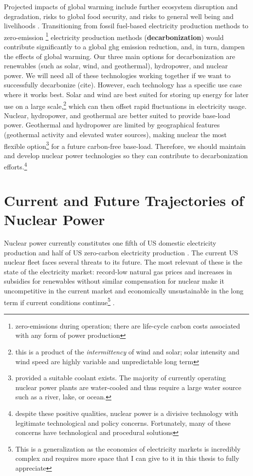Projected impacts of global warming include further ecosystem disruption and
degradation, risks to global food security, and risks to general well being and
livelihoods \cite{hans_portner_2022_ts}. Transitioning from fossil
fuel-based electricity production methods to zero-emission
\footnote{zero-emissions during operation; there are life-cycle carbon costs
associated with any form of power production} electricity production methods
(\textbf{decarbonization}) would contribute significantly to a global \Gls{ghg}
emission reduction, and, in turn, dampen the effects of global
warming\cite{minal_pathak_2022_ts}. Our three main options for decarbonization
are renewables (such as solar, wind, and geothermal), hydropower, and nuclear power. We will
need all of these technologies working together if we want to successfully
decarbonize (cite). However, each technology has a specific use case where it works
best. Solar and wind are best suited for storing up energy for later use on a
large scale,\footnote{this is a product of the {\it intermittency} of wind and
solar; solar intensity and wind speed are highly variable and unpredictable
long term} which can then offset rapid fluctuations in electricity usage.
Nuclear, hydropower, and geothermal are better suited to provide
base-load power\cite{eia_electricity_2021}. Geothermal and hydropower are
limited by geographical features (geothermal activity and elevated water
sources), making nuclear the most flexible option\footnote{provided a suitable
coolant exists. The majority of currently operating nuclear power plants are
water-cooled and thus require a large water source such as a river, lake, or
ocean.} for a future carbon-free base-load. Therefore, we should
maintain and develop nuclear power technologies so they can contribute to
decarbonization efforts.\footnote{despite these positive qualities, nuclear
power is a divisive technology with legitimate technological and policy
concerns. Fortunately, many of these concerns have technological and procedural
solutions}

\section{Current and Future Trajectories of Nuclear Power}%
\label{sec:current_and_future_trajectories_of_nuclear_power}
Nuclear power currently constitutes one fifth of US domestic electricity
production and half of US zero-carbon electricity production
\cite{eia_faq_2021} \cite{doene_facts_2021}. The current US nuclear
fleet faces several threats to its future. The most relevant of
these is the state of the electricity market: record-low natural gas prices and
increases in subsidies for renewables without similar compensation for
nuclear make it uncompetitive in the current market and economically unsustainable in the
long term if current conditions continue\footnote{This is a generalization as
the economics of electricity markets is incredibly complex and requires more space that I can give to it
in this thesis to fully appreciate} \cite{szilard_economic_2016}.

